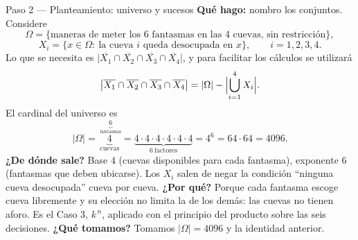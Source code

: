 \documentclass[11pt]{article}
\begin{document}
\begin{sol}
\begin{paso}{Paso 2 --- Planteamiento: universo y sucesos}
\textbf{Qué hago:} nombro los conjuntos. Considere
\[
\Omega=\{\text{maneras de meter los 6 fantasmas en las 4 cuevas, sin restricción}\},
\]
\[
X_i=\{x\in\Omega:\ \text{la cueva }i\text{ queda desocupada en }x\},\qquad i=1,2,3,4 .
\]
Lo que se necesita es $\bigl|\overline{X_1}\cap\overline{X_2}\cap\overline{X_3}\cap\overline{X_4}\bigr|$, y para facilitar los cálculos se utilizará
\[
\bigl|\overline{X_1}\cap\overline{X_2}\cap\overline{X_3}\cap\overline{X_4}\bigr|=|\Omega|-\Bigl|\bigcup_{i=1}^{4}X_i\Bigr| .
\]
El cardinal del universo es
\[
|\Omega|=\underbrace{4}_{\text{cuevas}}^{\;\underbrace{6}_{\text{fantasmas}}}
=\underbrace{4\cdot4\cdot4\cdot4\cdot4\cdot4}_{6\ \text{factores}}=4^6=64\cdot 64=4096 .
\]
\textbf{¿De dónde sale?} Base $4$ (cuevas disponibles para cada fantasma), exponente $6$ (fantasmas que deben ubicarse). Los $X_i$ salen de negar la condición ``ninguna cueva desocupada'' cueva por cueva.
\textbf{¿Por qué?} Porque cada fantasma escoge cueva libremente y su elección no limita la de los demás: las cuevas no tienen aforo. Es el Caso 3, $k^{\,n}$, aplicado con el principio del producto sobre las seis decisiones.
\textbf{¿Qué tomamos?} Tomamos $|\Omega|=4096$ y la identidad anterior.
\end{paso}


\end{sol}
\end{document}

